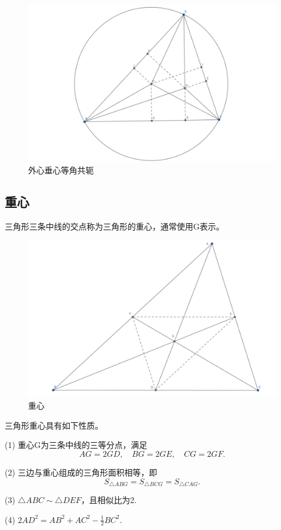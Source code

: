 \begin{figure}[htbp]
    \centering
    \includegraphics[width=0.7\linewidth]{figures/外心垂心等角共轭.png}
    \caption{外心垂心等角共轭}
\end{figure}


\newpage
\subsection{重心}
\begin{definition}[重心]
    三角形三条中线的交点称为三角形的重心，通常使用G表示。
\end{definition}

\begin{figure}[ht]
    \centering
    \includegraphics[width=\linewidth]{figures/重心.png}
    \caption{重心}
\end{figure}

\begin{proposition}[重心性质]
    三角形重心具有如下性质。
    
    (1) 重心G为三条中线的三等分点，满足
    $$AG=2GD,\quad 
    BG=2GE,\quad
    CG=2GF.$$

    (2) 三边与重心组成的三角形面积相等，即
    $$S_{\triangle ABG} = S_{\triangle BCG}=S_{\triangle CAG}.$$

    (3) $\triangle ABC \sim \triangle DEF$，且相似比为2.

    (4) $2AD^2=AB^2+AC^2-\frac{1}{2}BC^2.$
\end{proposition}
\newpage
